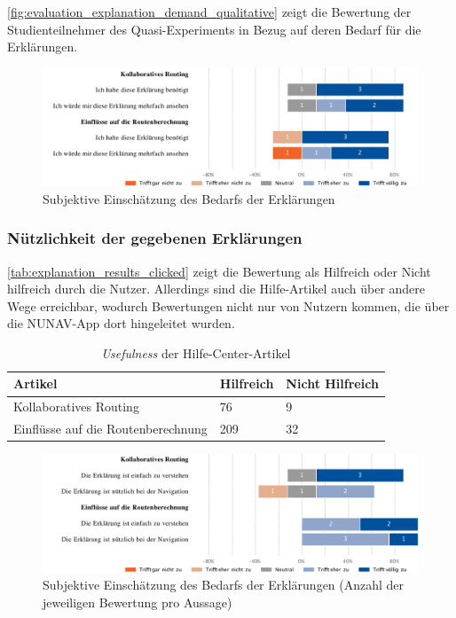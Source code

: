 \autoref{fig:evaluation_explanation_demand_qualitative} zeigt die Bewertung der Studienteilnehmer des Quasi-Experiments in Bezug auf deren Bedarf für die Erklärungen.

\begin{figure}[htb!]
    \centering
    \includegraphics[width=\textwidth]{contents/06_model_evaluation/02_evaluation/res/qualitativeFeedback-evaluation_explanation_demand_qualitative.pdf}
    \caption{Subjektive Einschätzung des Bedarfs der Erklärungen}
    \label{fig:evaluation_explanation_demand_qualitative}
\end{figure}

\subsubsection{Nützlichkeit der gegebenen Erklärungen}

\autoref{tab:explanation_results_clicked} zeigt die Bewertung als \glqq Hilfreich\grqq{} oder \glqq Nicht hilfreich\grqq{} durch die Nutzer. Allerdings sind die Hilfe-Artikel auch über andere Wege erreichbar, wodurch Bewertungen nicht nur von Nutzern kommen, die über die NUNAV-App dort hingeleitet wurden.

\begin{table}[htb!]
    \centering
    \begin{tabular}{p{}p{}p{}}
        \hline
        Artikel & Hilfreich & Nicht Hilfreich \\
        \toprule
        Kollaboratives Routing & 76 & 9 \\
        Einflüsse auf die Routenberechnung & 209 & 32 \\
        \bottomrule
    \end{tabular}
    \caption{\textit{Usefulness} der Hilfe-Center-Artikel}
    \label{tab:explanation_results_clicked}
\end{table}

\begin{figure}[htb!]
    \centering
    \includegraphics[width=\textwidth]{contents/06_model_evaluation/02_evaluation/res/qualitativeFeedback-evaluation_usefulness_qualitative.pdf}
    \caption{Subjektive Einschätzung des Bedarfs der Erklärungen (Anzahl der jeweiligen Bewertung pro Aussage)}
    \label{fig:evaluation_usefulness_qualitative}
\end{figure}

